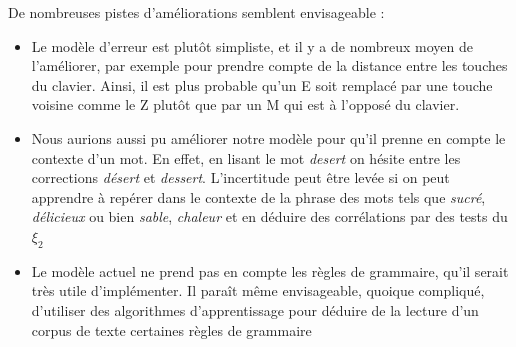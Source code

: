 \documentclass[10pt,a4paper]{article}
\begin{document}
De nombreuses pistes d'améliorations semblent envisageable :\\

\begin{itemize}
\item Le modèle d'erreur est plutôt simpliste, et il y a de nombreux moyen de l'améliorer, par exemple pour prendre compte de la distance entre les touches du clavier. Ainsi, il est plus probable qu'un E soit remplacé par une touche voisine comme le Z plutôt que par un M qui est à l'opposé du clavier. 

\item Nous aurions aussi pu améliorer notre modèle pour qu'il prenne en compte le contexte d'un mot. En effet, en lisant le mot \textit{desert} on hésite entre les corrections \textit{désert} et \textit{dessert}. L'incertitude peut être levée si on peut apprendre à repérer dans le contexte de la phrase des mots tels que \textit{sucré}, \textit{délicieux} ou bien \textit{sable}, \textit{chaleur} et en déduire des corrélations par des tests du $\xi_2$
\item Le modèle actuel ne prend pas en compte les règles de grammaire, qu'il serait très utile d'implémenter. Il paraît même envisageable, quoique compliqué, d'utiliser des algorithmes d'apprentissage pour déduire de la lecture d'un corpus de texte certaines règles de grammaire
\end{itemize}
\end{document}
